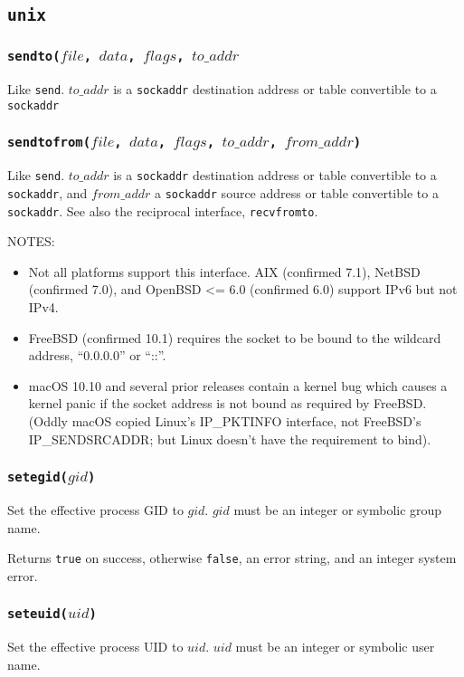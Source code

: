 \documentclass[11pt, oneside]{memoir}
\newcommand*{\true}[0]{\texttt{true}\xspace}
\newcommand*{\false}[0]{\texttt{false}\xspace}
\newcommand*{\syscall}[1]{\texttt{#1}\xspace}
\newcommand*{\fn}[1]{\texttt{#1}\xspace}
\newcommand*{\sockaddr}[0]{\texttt{sockaddr}\xspace}
\newcounter{toccols}
\newenvironment{Module}[1]{
	\subsection{\texttt{#1}}
	\addtocontents{toc}{
		\protect\begin{multicols}{\value{toccols}}
	}
}{
	\addtocontents{toc}{\protect\end{multicols}}
}
\begin{document}
\begin{Module}{unix}
\subsubsection[\fn{sendto}]{\fn{sendto($file$, $data$, $flags$, $to\_addr$}}

Like \syscall{send}. $to\_addr$ is a \sockaddr destination address or table convertible to a \sockaddr

\subsubsection[\fn{sendtofrom}]{\fn{sendtofrom($file$, $data$, $flags$, $to\_addr$, $from\_addr$)}}

Like \syscall{send}. $to\_addr$ is a \sockaddr destination address or table convertible to a \sockaddr, and $from\_addr$ a \sockaddr source address or table convertible to a \sockaddr. See also the reciprocal interface, \syscall{recvfromto}.

NOTES:
\begin{itemize}
\item Not all platforms support this interface. AIX (confirmed 7.1), NetBSD (confirmed 7.0), and OpenBSD <= 6.0 (confirmed 6.0) support IPv6 but not IPv4.
\item FreeBSD (confirmed 10.1) requires the socket to be bound to the wildcard address, ``0.0.0.0'' or ``::''.
\item macOS 10.10 and several prior releases contain a kernel bug which causes a kernel panic if the socket address is not bound as required by FreeBSD. (Oddly macOS copied Linux's IP\_PKTINFO interface, not FreeBSD's IP\_SENDSRCADDR; but Linux doesn't have the requirement to bind).
\end{itemize}

\subsubsection[\fn{setegid}]{\fn{setegid($gid$)}}

Set the effective process GID to $gid$. $gid$ must be an integer or symbolic group name.

Returns \true on success, otherwise \false, an error string, and an integer system error.

\subsubsection[\fn{seteuid}]{\fn{seteuid($uid$)}}

Set the effective process UID to $uid$. $uid$ must be an integer or symbolic user name.


\end{Module}
\end{document}
